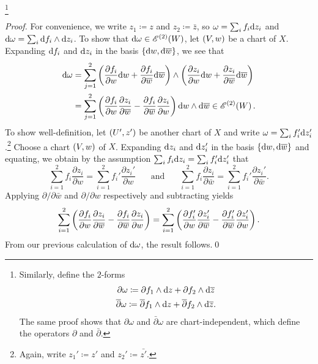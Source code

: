 \documentclass[../Moduli_Spaces_of_Riemann_Surfaces.tex]{subfiles}
\begin{document}
    \footnote{Similarly, define the $2$-forms
        \begin{equation*}
            \begin{gathered}
                \partial\omega\coloneqq\partial f_1\wedge\mathrm{d} z+\partial f_2\wedge\mathrm{d}\overline{z} \\
                \overline{\partial}\omega\coloneqq\overline{\partial}f_1\wedge\mathrm{d} z+\overline{\partial}f_2\wedge\mathrm{d}\overline{z}.
            \end{gathered}
        \end{equation*}
    The same proof shows that $\partial\omega$ and $\bar{\partial}\omega$ are chart-independent, which define the operators $\partial$ and $\bar{\partial}$.}
    \vspace{-0.05in}
    \begin{proof}
        For convenience, we write $z_1\coloneqq z$ and $z_2\coloneqq\bar{z}$, so $\omega=\sum_if_i\mathrm{d} z_i$ and $\mathrm{d}\omega=\sum_i\mathrm{d} f_i\wedge\mathrm{d} z_i$. To show that $\mathrm{d}\omega\in\mathscr{E}^{\left(2\right)}\!\left(W\right)$, let $\left(V,w\right)$ be a chart of $X$. Expanding $\mathrm{d} f_i$ and $\mathrm{d} z_i$ in the basis $\left\{\mathrm{d} w,\mathrm{d}\overline{w}\right\}$, we see that
            \begin{equation*}
                \begin{aligned}
                    \mathrm{d}\omega&=\sum_{j=1}^{2}\left(\frac{\partial f_i}{\partial w}\mathrm{d} w+\frac{\partial f_i}{\partial\overline{w}}\mathrm{d}\overline{w}\right)\wedge\left(\frac{\partial z_i}{\partial w}\mathrm{d} w+\frac{\partial z_i}{\partial\overline{w}}\mathrm{d}\overline{w}\right) \\
                            &=\sum_{j=1}^{2}\left(\frac{\partial f_i}{\partial w}\frac{\partial z_i}{\partial\overline{w}}-\frac{\partial f_i}{\partial\overline{w}}\frac{\partial z_i}{\partial w}\right)\mathrm{d} w\wedge\mathrm{d}\overline{w}\in\mathscr{E}^{\left(2\right)}\!\left(W\right).
                \end{aligned}
            \end{equation*}
        To show well-definition, let $\left(U',z'\right)$ be another chart of $X$ and write $\omega=\sum_if_i'\mathrm{d} z_i'$.\footnote{Again, write $z_1'\coloneqq z'$ and $z_2'\coloneqq\bar{z'}$.} Choose a chart $\left(V,w\right)$ of $X$. Expanding $\mathrm{d} z_i$ and $\mathrm{d} z_i'$ in the basis $\left\{\mathrm{d} w,\mathrm{d}\overline{w}\right\}$ and equating, we obtain by the assumption $\sum_if_i\mathrm{d} z_i=\sum_if_i'\mathrm{d} z_i'$ that
        \begin{equation*}
            \sum_{i=1}^{2}f_i\frac{\partial z_i}{\partial w}=\sum_{i=1}^{2}f_i'\frac{\partial z_i'}{\partial w}\ \ \ \ \ \ \ \ \textrm{and}\ \ \ \ \ \ \ \ \sum_{i=1}^{2}f_i\frac{\partial z_i}{\partial\bar{w}}=\sum_{i=1}^{2}f_i'\frac{\partial z_i'}{\partial\bar{w}}.
        \end{equation*}
        Applying $\partial/\partial\bar{w}$ and $\partial/\partial w$ respectively and subtracting yields
        \begin{equation*}
            \sum_{i=1}^{2}\left(\frac{\partial f_i}{\partial w}\frac{\partial z_i}{\partial\overline{w}}-\frac{\partial f_i}{\partial\overline{w}}\frac{\partial z_i}{\partial w}\right)=\sum_{i=1}^{2}\left(\frac{\partial f_i'}{\partial w}\frac{\partial z_i'}{\partial\overline{w}}-\frac{\partial f_i'}{\partial\overline{w}}\frac{\partial z_i'}{\partial w}\right).
        \end{equation*}
        From our previous calculation of $\mathrm{d}\omega$, the result follows.\qed
    \end{proof}
\end{document}
